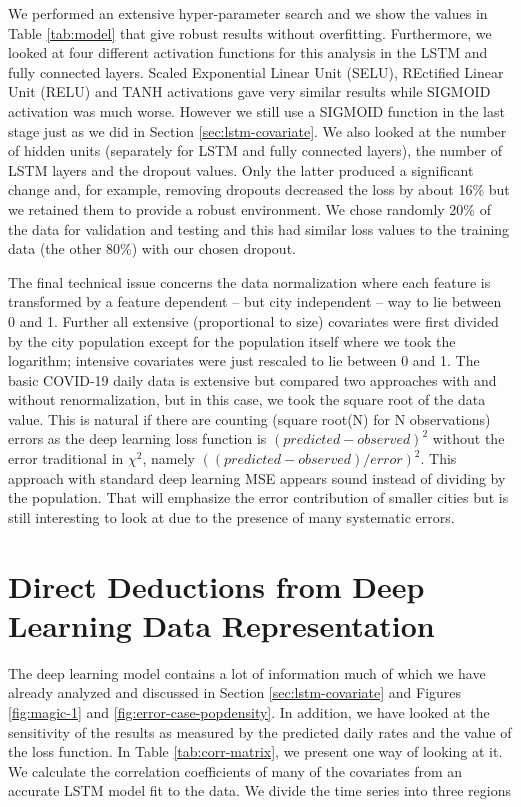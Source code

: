 \documentclass[letterpaper, inpress]{jds} %
\renewcommand{\_}{%
    \textunderscore\hspace{0pt}%
}
\begin{document}
We performed an extensive hyper-parameter search and we show the
values in Table \ref{tab:model} that give robust results without
overfitting. Furthermore, we looked at four different activation
functions for this analysis in the LSTM and fully connected
layers. Scaled Exponential Linear Unit (SELU), REctified Linear Unit
(RELU) and TANH activations gave very similar results while SIGMOID
activation was much worse. However we still use a SIGMOID function in
the last stage just as we did in Section \ref{sec:lstm-covariate}. We
also looked at the number of hidden units (separately for LSTM and
fully connected layers), the number of LSTM layers and the dropout
values.  Only the latter produced a significant change and, for
example, removing dropouts decreased the loss by about 16\% but we
retained them to provide a robust environment. We chose randomly 20\%
of the data for validation and testing and this had similar loss
values to the training data (the other 80\%) with our chosen dropout.

The final technical issue concerns the data normalization where each
feature is transformed by a feature dependent -- but city independent
-- way to lie between 0 and 1. Further all extensive (proportional to
size) covariates were first divided by the city population except for
the population itself where we took the logarithm; intensive
covariates were just rescaled to lie between 0 and 1. The basic
COVID-19 daily data is extensive but compared two approaches with and
without renormalization, but in this case, we took the square root of
the data value.  This is natural if there are counting (square root(N)
for N observations) errors as the deep learning loss function is
$(predicted-observed)^{2}$ without the error traditional in
$\chi^{2}$, namely $((predicted-observed)/error)^{2}$. This approach
with standard deep learning MSE appears sound instead of dividing by
the population. That will emphasize the error contribution of smaller
cities but is still interesting to look at due to the presence of many
systematic errors.


\section{Direct Deductions from Deep Learning Data Representation}

The deep learning model contains a lot of information much of which we
have already analyzed and discussed in Section
\ref{sec:lstm-covariate} and Figures \ref{fig:magic-1} and
\ref{fig:error-case-popdensity}. In addition, we have looked at the
sensitivity of the results as measured by the predicted daily rates
and the value of the loss function. In Table \ref{tab:corr-matrix}, we
present one way of looking at it. We calculate the correlation
coefficients of many of the covariates from an accurate LSTM model fit
to the data. We divide the time series into three regions
\end{document}

